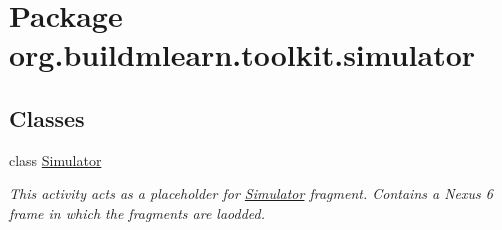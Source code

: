 \hypertarget{namespaceorg_1_1buildmlearn_1_1toolkit_1_1simulator}{\section{Package org.\-buildmlearn.\-toolkit.\-simulator}
\label{namespaceorg_1_1buildmlearn_1_1toolkit_1_1simulator}
}
\subsection*{Classes}
\begin{DoxyCompactItemize}
\item 
class \hyperlink{classorg_1_1buildmlearn_1_1toolkit_1_1simulator_1_1Simulator}{Simulator}
\begin{DoxyCompactList}\small\item\em This activity acts as a placeholder for \hyperlink{classorg_1_1buildmlearn_1_1toolkit_1_1simulator_1_1Simulator}{Simulator} fragment. Contains a Nexus 6 frame in which the fragments are laodded. \end{DoxyCompactList}\end{DoxyCompactItemize}
